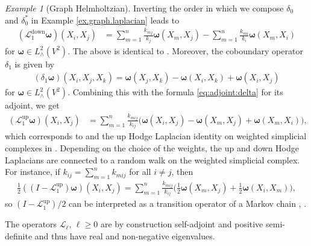 \documentclass[10pt]{article}
\DeclareMathOperator{\up}{up}
\DeclareMathOperator{\down}{down}
\theoremstyle{plain}
\theoremstyle{definition}
\theoremstyle{remark}
\newtheorem{example}{Example}
\begin{document}
    \begin{example}[Graph Helmholtzian] 
        \label{ex.graph.helmholtzian}
        Inverting the order in which we compose $\delta_0$ and $\delta_0^*$ in Example \ref{ex.graph.laplacian} leads to 
        \begin{align*}
            (\mathscr{L}_{1}^{\down}\boldsymbol{\omega})(X_i, X_j) &= \sum_{m=1}^n \frac{k_{mj}}{k_{j}}\boldsymbol{\omega}(X_m, X_{j}) - \sum_{m=1}^n \frac{k_{mi}}{k_{i}}\boldsymbol{\omega}(X_m, X_{i})
        \end{align*}
        for $\boldsymbol{\omega} \in L^2_{\wedge}(V^2)$. The above is identical to \cite[Eqn.~(2.7)]{eidi2023irreducibility}. Moreover, the coboundary operator $\delta_1$ is given by
        \begin{align}\label{eq:Helm:up}
            (\delta_1\boldsymbol{\omega})(X_{i}, X_{j}, X_{k}) = \boldsymbol{\omega}(X_{j}, X_{k}) - \boldsymbol{\omega}(X_{i}, X_{k}) + \boldsymbol{\omega}(X_{i}, X_{j})
        \end{align}
        for $\boldsymbol{\omega} \in L^2_{\wedge}(V^2)$.  Combining this with the formula \eqref{eq:adjoint:delta} for its adjoint, we get
        \begin{align*}
            (\mathscr{L}_1^{\up}\boldsymbol{\omega})(X_{i}, X_{j}) &= \sum_{m =1}^n\frac{k_{m i j}}{k_{i j}} \big(\boldsymbol{\omega}(X_{i}, X_{j}) - \boldsymbol{\omega}(X_m, X_{j}) + \boldsymbol{\omega}(X_m, X_{i})\big),
        \end{align*}
        which corresponds to \cite[Eqn.\ (2.6)]{eidi2023irreducibility} and the up Hodge Laplacian identity on weighted simplicial complexes in \cite{Horak13}.  Depending on the choice of the weights, the up and down Hodge Laplacians are connected to a random walk on the weighted simplicial complex. For instance, if $k_{ij} = \sum_{m =1}^n k_{mij}$ for all $i\neq j$, then 
         \begin{align*}
        \frac{1}{2}((I - \mathscr{L}_1^{\up})\boldsymbol{\omega})(X_i, X_j) = \sum_{m = 1}^{n}\frac{k_{mij}}{k_{ij}}\bigg(\frac 12 \boldsymbol{\omega}(X_m, X_j) + \frac 12\boldsymbol{\omega}(X_i, X_m)\bigg),
    \end{align*}
    so $(I - \mathscr{L}_1^{\up})/2$ can be interpreted as a transition operator of a Markov chain \cite{MR3607124}, \cite{Mukherjee16}.
    \end{example}    
    The operators $\mathscr{L}_\ell$, $\ell\geq 0$ are by construction self-adjoint and positive semi-definite and thus have real and non-negative eigenvalues. 
\end{document}

